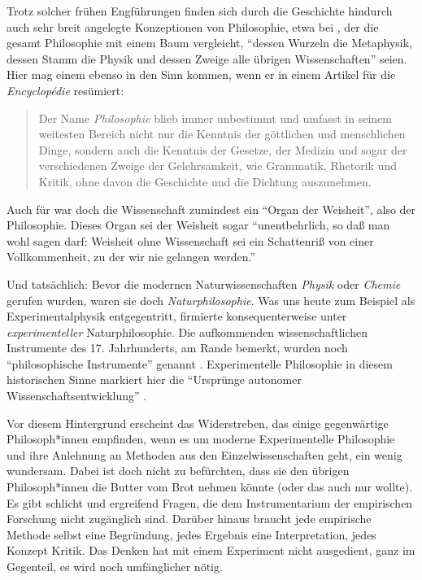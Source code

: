 \documentclass[justified,nobib,nohyper,symmetric,twoside]{tufte-book}
\begin{document}
Trotz solcher frühen Engführungen finden sich durch die Geschichte hindurch auch sehr breit angelegte Konzeptionen von Philosophie, etwa bei \citet[S.~XLII]{descartes_prinzipien_1992}, der die gesamt Philosophie mit einem Baum vergleicht, \enquote{dessen Wurzeln die Metaphysik, dessen Stamm die Physik und dessen Zweige alle übrigen Wissenschaften} seien.
Hier mag einem ebenso \citet[S.~394]{diderot_philosophie_1961} in den Sinn kommen, wenn er in einem Artikel für die \textit{Encyclopédie} resümiert:

\begin{quote}
   Der Name \textit{Philosophie} blieb immer unbestimmt und umfasst in seinem weitesten Bereich nicht nur die Kenntnis der göttlichen und menschlichen Dinge, sondern auch die Kenntnis der Gesetze, der Medizin und sogar der verschiedenen Zweige der Gelehrsamkeit, wie Grammatik, Rhetorik und Kritik, ohne davon die Geschichte und die Dichtung auszunehmen.
\end{quote}

\noindent Auch für \citet[S.~349]{kant_logik_1838} war doch die Wissenschaft zumindest ein \enquote{Organ der Weisheit}, also der Philosophie.
Dieses Organ sei der Weisheit sogar \enquote{unentbehrlich, so daß man wohl sagen darf: Weisheit ohne Wissenschaft sei ein Schattenriß von einer Vollkommenheit, zu der wir nie gelangen werden.}

Und tatsächlich: Bevor die modernen Naturwissenschaften \textit{Physik} oder \textit{Chemie} gerufen wurden, waren sie doch \textit{Naturphilosophie}.
Was uns heute zum Beispiel als Experimentalphysik entgegentritt, firmierte konsequenterweise unter \textit{experimenteller} Naturphilosophie.
Die aufkommenden wissenschaftlichen Instrumente des 17. Jahrhunderts, am Rande bemerkt, wurden noch \enquote{philosophische Instrumente} genannt \citep[S.~4]{zuidervaart_cabinets_2013}.
Experimentelle Philosophie in diesem historischen Sinne markiert hier die \enquote{Ursprünge autonomer Wissenschaftsentwicklung} \citep{boehme_experimentelle_1977}.

Vor diesem Hintergrund erscheint das Widerstreben, das einige gegenwärtige Philosoph*innen empfinden, wenn es um moderne Experimentelle Philosophie und ihre Anlehnung an Methoden aus den Einzelwissenschaften geht, ein wenig wundersam.
Dabei ist doch nicht zu befürchten, dass sie den übrigen Philosoph*innen die Butter vom Brot nehmen könnte (oder das auch nur wollte).
Es gibt schlicht und ergreifend Fragen, die dem Instrumentarium der empirischen Forschung nicht zugänglich sind.
Darüber hinaus braucht jede empirische Methode selbst eine Begründung, jedes Ergebnis eine Interpretation, jedes Konzept Kritik.
Das Denken hat mit einem Experiment nicht ausgedient, ganz im Gegenteil, es wird noch umfänglicher nötig.
\end{document}
